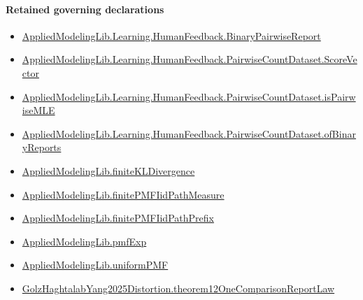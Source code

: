 \documentclass[10pt]{article}
\begin{document}
\paragraph{Retained governing declarations}
\begin{itemize}\raggedright
\item \hyperlink{governing-declaration-bc3d6ca8e7e0ac9d}{Applied\allowbreak{}Modeling\allowbreak{}Lib.\allowbreak{}Learning.\allowbreak{}Human\allowbreak{}Feedback.\allowbreak{}Binary\allowbreak{}Pairwise\allowbreak{}Report}
\item \hyperlink{governing-declaration-87eda978eb1b0c9d}{Applied\allowbreak{}Modeling\allowbreak{}Lib.\allowbreak{}Learning.\allowbreak{}Human\allowbreak{}Feedback.\allowbreak{}Pairwise\allowbreak{}Count\allowbreak{}Dataset.\allowbreak{}Score\allowbreak{}Vector}
\item \hyperlink{governing-declaration-cba21d23e0e5aa10}{Applied\allowbreak{}Modeling\allowbreak{}Lib.\allowbreak{}Learning.\allowbreak{}Human\allowbreak{}Feedback.\allowbreak{}Pairwise\allowbreak{}Count\allowbreak{}Dataset.\allowbreak{}is\allowbreak{}Pairwise\allowbreak{}MLE}
\item \hyperlink{governing-declaration-449f87e91bf37ce0}{Applied\allowbreak{}Modeling\allowbreak{}Lib.\allowbreak{}Learning.\allowbreak{}Human\allowbreak{}Feedback.\allowbreak{}Pairwise\allowbreak{}Count\allowbreak{}Dataset.\allowbreak{}of\allowbreak{}Binary\allowbreak{}Reports}
\item \hyperlink{library-prerequisite-d3573881ae45d4c6}{Applied\allowbreak{}Modeling\allowbreak{}Lib.\allowbreak{}finite\allowbreak{}KL\allowbreak{}Divergence}
\item \hyperlink{governing-declaration-779fe1555fbbcea5}{Applied\allowbreak{}Modeling\allowbreak{}Lib.\allowbreak{}finite\allowbreak{}PMF\allowbreak{}Iid\allowbreak{}Path\allowbreak{}Measure}
\item \hyperlink{governing-declaration-89219e02ea5145c7}{Applied\allowbreak{}Modeling\allowbreak{}Lib.\allowbreak{}finite\allowbreak{}PMF\allowbreak{}Iid\allowbreak{}Path\allowbreak{}Prefix}
\item \hyperlink{governing-declaration-8e4b4389a4f6454b}{Applied\allowbreak{}Modeling\allowbreak{}Lib.\allowbreak{}pmf\allowbreak{}Exp}
\item \hyperlink{governing-declaration-48f10f2715c04df3}{Applied\allowbreak{}Modeling\allowbreak{}Lib.\allowbreak{}uniform\allowbreak{}PMF}
\item \hyperlink{governing-declaration-9f5f3a71633fcfda}{Golz\allowbreak{}Haghtalab\allowbreak{}Yang2025\allowbreak{}Distortion.\allowbreak{}theorem12\allowbreak{}One\allowbreak{}Comparison\allowbreak{}Report\allowbreak{}Law}

\end{itemize}
\end{document}

